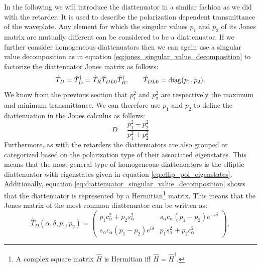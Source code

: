 In the following we will introduce the diattenuator in a similar fashion as we did with the retarder. It is used to describe the polarization dependent transmittance of the waveplate. Any element for which the singular values $p_1$ and $p_2$ of its Jones matrix are mutually different can be considered to be a diattenuator. If we further consider homogeneous diattenuators then we can again use a singular value decomposition as in equation \ref{eq:jones_singular_value_decomposition} to factorize the diattenuator Jones matrix as follows:
\begin{equation}
    \label{eq:diattenuator_singular_value_decomposition}
    \hat{T}_D = \hat{T}_D^{\dagger} = \hat{T}_R\hat{T}_{DL0}\hat{T}_R^{\dagger}, 
    \qquad 
    \hat{T}_{DL0}=\operatorname{diag}(p_1, p_2).
\end{equation}
We know from the previous section that $p_1^2$ and $p_2^2$ are respectively the maximum and minimum transmittance. We can therefore use $p_1$ and $p_2$ to define the diattenuation in the Jones calculus as follows: 
\begin{equation}
    \label{eq:diattenuation_1}
    D = \frac{p_1^2-p_2^2}{p_1^2+p_2^2}
\end{equation}
Furthermore, as with the retarders the diattenuators are also grouped or categorized based on the polarization type of their associated eigenstates. This means that the most general type of homogeneous diattenuators is the elliptic diattenuator with eigenstates given in equation \ref{eq:ellip_pol_eigenstates}. Additionally, equation \ref{eq:diattenuator_singular_value_decomposition} shows that the diattenuator is represented by a Hermitian\footnote{A complex square matrix $\hat{H}$ is Hermitian iff $\hat{H}=\hat{H}^{\dagger}$.} matrix. This means that the Jones matrix of the most common diattenuator can be written as:
\begin{equation}
    \hat{T}_D(\alpha, \delta, p_1, p_2) = 
    \begin{pmatrix} 
    p_1 c_{\alpha}^2 + p_2 s_{\alpha}^2 & s_{\alpha}c_{\alpha}(p_1-p_2)e^{-i\delta} \\
    s_{\alpha}c_{\alpha}(p_1-p_2)e^{i\delta} & p_1 s_{\alpha}^2 + p_2 c_{\alpha}^2
    \end{pmatrix},
\end{equation}
